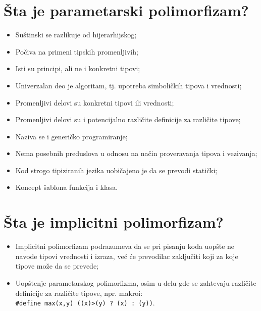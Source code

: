 \documentclass[a4paper]{article}
\begin{document}
\section{Šta je parametarski polimorfizam?}
  \begin{itemize}
    \item Suštinski se razlikuje od hijerarhijskog;
    \item Počiva na primeni tipskih promenljivih;
    \item Isti su principi, ali ne i konkretni tipovi;
    \item Univerzalan deo je algoritam, tj. upotreba simboličkih tipova i vrednosti;
    \item Promenljivi delovi su konkretni tipovi ili vrednosti;
    \item Promenljivi delovi su i potencijalno različite definicije za različite tipove;
    \item Naziva se i generičko programiranje;
    \item Nema posebnih preduslova u odnosu na način proveravanja tipova i vezivanja;
    \item Kod strogo tipiziranih jezika uobičajeno je da se prevodi statički;
    \item Koncept šablona funkcija i klasa.
  \end{itemize}

\section{Šta je implicitni polimorfizam?}
  \begin{itemize}
    \item Implicitni polimorfizam podrazumeva da se pri pisanju koda uopšte ne navode tipovi vrednosti i izraza, već će prevodilac zaključiti koji za koje tipove može da se prevede;
    \item Uopštenje parametarskog polimorfizma, osim u delu gde se zahtevaju različite definicije za različite tipove, npr. makroi: \\
	\texttt{\#define max(x,y) ((x)>(y) ? (x) : (y))}.
  \end{itemize}
\end{document}

